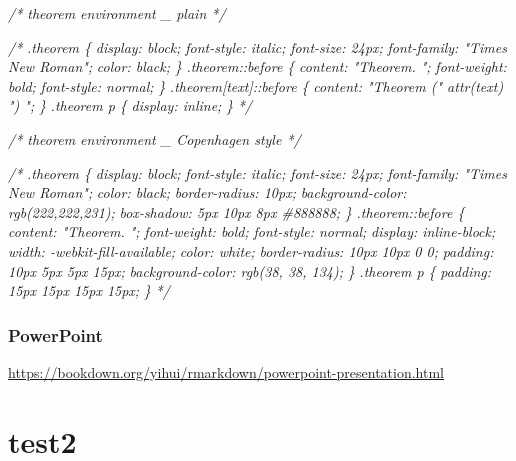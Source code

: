 \documentclass[
]{book}
\newenvironment{Shaded}{\begin{snugshade}}{\end{snugshade}}
\newcommand{\CommentTok}[1]{\textcolor[rgb]{0.56,0.35,0.01}{\textit{#1}}}
\theoremstyle{definition}
\theoremstyle{definition}
\theoremstyle{definition}
\theoremstyle{definition}
\theoremstyle{remark}
\begin{document}
\begin{Shaded}
\begin{Highlighting}[]

\CommentTok{/* theorem environment \_ plain */}

\CommentTok{/*}
\CommentTok{.theorem \{}
\CommentTok{  display: block;}
\CommentTok{  font{-}style: italic;}
\CommentTok{  font{-}size: 24px;}
\CommentTok{  font{-}family: "Times New Roman";}
\CommentTok{  color: black;}
\CommentTok{\}}
\CommentTok{.theorem::before \{}
\CommentTok{  content: "Theorem. ";}
\CommentTok{  font{-}weight: bold;}
\CommentTok{  font{-}style: normal;}
\CommentTok{\}}
\CommentTok{.theorem[text]::before \{}
\CommentTok{  content: "Theorem (" attr(text) ") ";}
\CommentTok{\}}
\CommentTok{.theorem p \{}
\CommentTok{  display: inline;}
\CommentTok{\}}
\CommentTok{*/}

\CommentTok{/* theorem environment \_ Copenhagen style */}

\CommentTok{/*}
\CommentTok{.theorem \{}
\CommentTok{  display: block;}
\CommentTok{  font{-}style: italic;}
\CommentTok{  font{-}size: 24px;}
\CommentTok{  font{-}family: "Times New Roman";}
\CommentTok{  color: black;}
\CommentTok{  border{-}radius: 10px;}
\CommentTok{  background{-}color: rgb(222,222,231);}
\CommentTok{  box{-}shadow: 5px 10px 8px \#888888;}
\CommentTok{\}}
\CommentTok{.theorem::before \{}
\CommentTok{  content: "Theorem. ";}
\CommentTok{  font{-}weight: bold;}
\CommentTok{  font{-}style: normal;}
\CommentTok{  display: inline{-}block;}
\CommentTok{  width: {-}webkit{-}fill{-}available;}
\CommentTok{  color: white;}
\CommentTok{  border{-}radius: 10px 10px 0 0;}
\CommentTok{  padding: 10px 5px 5px 15px;}
\CommentTok{  background{-}color: rgb(38, 38, 134);}
\CommentTok{\}}
\CommentTok{.theorem p \{}
\CommentTok{  padding: 15px 15px 15px 15px;}
\CommentTok{\}}
\CommentTok{*/}
\end{Highlighting}
\end{Shaded}

\subsection{PowerPoint}\label{powerpoint}

\url{https://bookdown.org/yihui/rmarkdown/powerpoint-presentation.html}

\chapter{test2}\label{test2}
\end{document}
